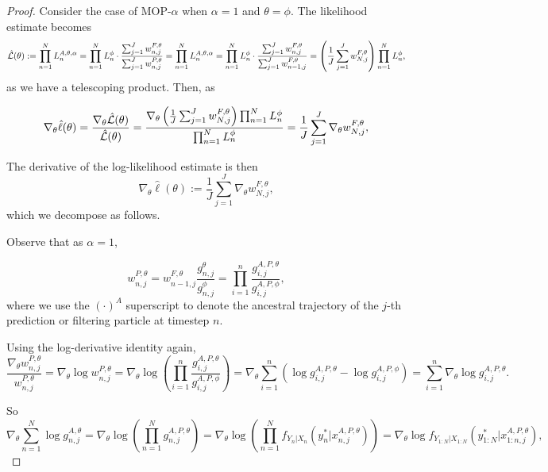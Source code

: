 \documentclass{article}
\begin{document}
\begin{proof}
    
Consider the case of MOP-$\alpha$ when $\alpha=1$ and $\theta=\phi$. The likelihood estimate becomes
\begin{equation*}
    \hat{\mathcal{L}}(\theta) := \prod_{n=1}^N L_n^{A, \theta, \alpha} = \prod_{n=1}^N L_n^\phi \cdot \frac{\sum_{j=1}^J w_{n,j}^{F,\theta}}{\sum_{j=1}^J w_{n,j}^{P,\theta}}= \prod_{n=1}^N L_n^{A, \theta, \alpha} = \prod_{n=1}^N L_n^\phi \cdot \frac{\sum_{j=1}^J w_{n,j}^{F,\theta}}{\sum_{j=1}^J w_{n-1,j}^{F,\theta}} = \left(\frac{1}{J}\sum_{j=1}^J w_{N,j}^{F,\theta}\right) \prod_{n=1}^N L_n^\phi,
\end{equation*}
as we have a telescoping product. Then, as

$$\nabla_\theta \hat\ell(\theta) = \frac{\nabla_\theta \hat{\mathcal{L}}(\theta)}{\hat{\mathcal{L}}(\theta)} = \frac{\nabla_\theta\left(\frac{1}{J}\sum_{j=1}^J w_{N,j}^{F,\theta}\right) \prod_{n=1}^N L_n^\phi}{\prod_{n=1}^N L_n^\phi} =  \frac{1}{J}\sum_{j=1}^J \nabla_\theta w_{N,j}^{F,\theta},$$

The derivative of the log-likelihood estimate is then
\begin{equation*}
    \nabla_\theta \hat{\ell}(\theta) := \frac{1}{J}\sum_{j=1}^J \nabla_\theta w_{N,j}^{F,\theta},
\end{equation*}
which we decompose as follows.

Observe that as $\alpha=1$,

$$w_{n,j}^{P,\theta} = w_{n-1,j}^{F,\theta}\frac{g_{n,j}^\theta}{g_{n,j}^\phi} = \prod_{i=1}^n \frac{g_{i,j}^{A,P,\theta}}{g_{i,j}^{A,P,\phi}},$$
where we use the $(\cdot)^A$ superscript to denote the ancestral trajectory of the $j$-th prediction or filtering particle at timestep $n$.

Using the log-derivative identity again,
$$\frac{\nabla_\theta w_{n,j}^{P,\theta}}{w_{n,j}^{P,\theta}} = \nabla_\theta \log w_{n,j}^{P,\theta} = \nabla_\theta \log \left(\prod_{i=1}^n \frac{g_{i,j}^{A,P,\theta}}{g_{i,j}^{A,P,\phi}}\right) = \nabla_\theta \sum_{i=1}^n \left(\log g_{i,j}^{A,P,\theta} - \log g_{i,j}^{A,P,\phi}\right) = \sum_{i=1}^n \nabla_\theta \log g_{i,j}^{A,P,\theta}.$$

So 
$$  \nabla_\theta \sum_{n=1}^N \log g_{n,j}^{A,\theta} = \nabla_\theta \log\left(\prod_{n=1}^N g_{n,j}^{A,P,\theta}\right) =  \nabla_\theta \log\left(\prod_{n=1}^N f_{Y_n|X_n}\left(y_n^* | x_{n,j}^{A, P,\theta}\right)\right) = \nabla_\theta \log f_{Y_{1:N}|X_{1:N}}\left(y_{1:N}^* | x_{1:n,j}^{A, P,\theta}\right),$$


\end{proof}
\end{document}
